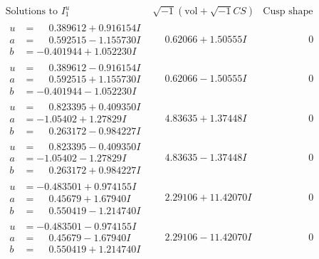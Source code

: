 \documentclass[1p]{elsarticle_modified}
\theoremstyle{definition}
\newcommand{\I}{\sqrt{-1}}
\begin{document}
$$\begin{array}{c|c|c}  
\text{Solutions to }I^u_{1}& \I (\text{vol} + \sqrt{-1}CS) & \text{Cusp shape}\\
 \hline 
\begin{aligned}
u &= \phantom{-}0.389612 + 0.916154 I \\
a &= \phantom{-}0.592515 - 1.155730 I \\
b &= -0.401944 + 1.052230 I\end{aligned}
 & \phantom{-}0.62066 + 1.50555 I & \phantom{-0.000000 } 0 \\ \hline\begin{aligned}
u &= \phantom{-}0.389612 - 0.916154 I \\
a &= \phantom{-}0.592515 + 1.155730 I \\
b &= -0.401944 - 1.052230 I\end{aligned}
 & \phantom{-}0.62066 - 1.50555 I & \phantom{-0.000000 } 0 \\ \hline\begin{aligned}
u &= \phantom{-}0.823395 + 0.409350 I \\
a &= -1.05402 + 1.27829 I \\
b &= \phantom{-}0.263172 - 0.984227 I\end{aligned}
 & \phantom{-}4.83635 + 1.37448 I & \phantom{-0.000000 } 0 \\ \hline\begin{aligned}
u &= \phantom{-}0.823395 - 0.409350 I \\
a &= -1.05402 - 1.27829 I \\
b &= \phantom{-}0.263172 + 0.984227 I\end{aligned}
 & \phantom{-}4.83635 - 1.37448 I & \phantom{-0.000000 } 0 \\ \hline\begin{aligned}
u &= -0.483501 + 0.974155 I \\
a &= \phantom{-}0.45679 + 1.67940 I \\
b &= \phantom{-}0.550419 - 1.214740 I\end{aligned}
 & \phantom{-}2.29106 + 11.42070 I & \phantom{-0.000000 } 0 \\ \hline\begin{aligned}
u &= -0.483501 - 0.974155 I \\
a &= \phantom{-}0.45679 - 1.67940 I \\
b &= \phantom{-}0.550419 + 1.214740 I\end{aligned}
 & \phantom{-}2.29106 - 11.42070 I & \phantom{-0.000000 } 0 \\ \hline\begin{aligned}

\end{aligned}
\end{array}$$
\end{document}
